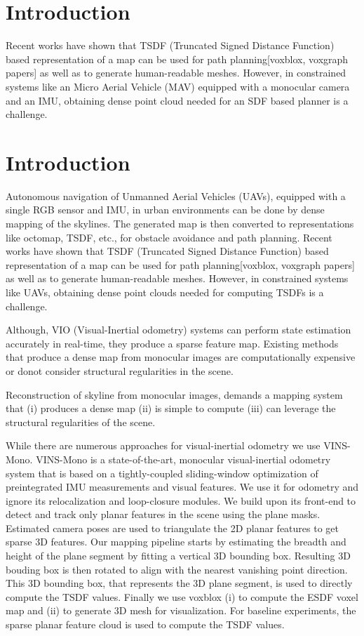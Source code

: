 \section{Introduction}
Recent works have shown that TSDF (Truncated Signed Distance Function) based representation of a map can be used for path planning[voxblox, voxgraph papers] as well as to generate human-readable meshes. However, in constrained systems like an Micro Aerial Vehicle (MAV) equipped with a monocular camera and an IMU, obtaining dense point cloud needed for an SDF based planner is a challenge.

\section{Introduction}
Autonomous navigation of Unmanned Aerial Vehicles (UAVs), equipped with a single RGB sensor and IMU, in urban environments can be done by dense mapping of the skylines. The generated map is then converted to representations like octomap, TSDF, etc., for obstacle avoidance and path planning. Recent works have shown that TSDF (Truncated Signed Distance Function) based representation of a map can be used for path planning[voxblox, voxgraph papers] as well as to generate human-readable meshes. However, in constrained systems like UAVs, obtaining dense point clouds needed for computing TSDFs is a challenge.

Although, VIO (Visual-Inertial odometry) systems can perform state estimation accurately in real-time, they produce a sparse feature map. Existing methods that produce a dense map from monocular images are computationally expensive or donot consider structural regularities in the scene.

Reconstruction of skyline from monocular images, demands a mapping system that (i) produces a dense map (ii) is simple to compute (iii) can leverage the structural regularities of the scene. 

While there are numerous approaches for visual-inertial odometry we use VINS-Mono. VINS-Mono is a state-of-the-art, monocular visual-inertial odometry system that is based on a tightly-coupled sliding-window optimization of preintegrated IMU measurements and visual features. We use it for odometry and ignore its relocalization and loop-closure modules. We build upon its front-end to detect and track only planar features in the scene using the plane masks. Estimated camera poses are used to triangulate the 2D planar features to get sparse 3D features. Our mapping pipeline starts by estimating the breadth and height of the plane segment by fitting a vertical 3D bounding box. Resulting 3D bouding box is then rotated to align with the nearest vanishing point direction. This 3D bounding box, that represents the 3D plane segment, is used to directly compute the TSDF values. Finally we use voxblox (i) to compute the ESDF voxel map and (ii) to generate 3D mesh for visualization. For baseline experiments, the sparse planar feature cloud is used to compute the TSDF values.

